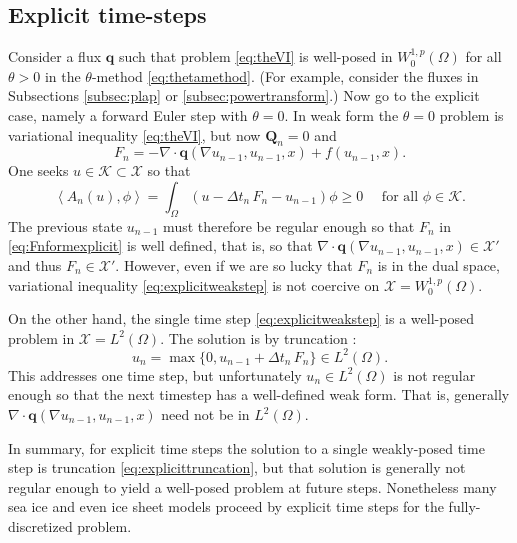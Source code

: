 \documentclass[final,onefignum]{siamart190516}
\newcommand\bq{\mathbf{q}}
\newcommand\bQ{\mathbf{Q}}
\newcommand{\Div}{\nabla\cdot}
\newcommand{\grad}{\nabla}
\newcommand{\ip}[2]{\ensuremath{\left<#1,#2\right>}}
\begin{document}
\subsection{Explicit time-steps} \label{subsec:explicit}   Consider a flux $\bq$ such that problem \eqref{eq:theVI} is well-posed in $W_0^{1,p}(\Omega)$ for all $\theta>0$ in the $\theta$-method \eqref{eq:thetamethod}.  (For example, consider the fluxes in Subsections \ref{subsec:plap} or \ref{subsec:powertransform}.)  Now go to the explicit case, namely a forward Euler step with $\theta=0$.  In weak form the $\theta=0$ problem is variational inequality \eqref{eq:theVI}, but now $\bQ_n=0$ and
\begin{equation}
F_n = - \Div \bq(\grad u_{n-1},u_{n-1},x) + f(u_{n-1},x).  \label{eq:Fnformexplicit}
\end{equation}
One seeks $u\in\mathcal{K} \subset \mathcal{X}$ so that
\begin{equation}
\ip{A_n(u)}{\phi} = \int_\Omega (u - \Delta t_n\,F_n - u_{n-1})\phi \ge 0 \quad \text{ for all } \phi \in \mathcal{K}.  \label{eq:explicitweakstep}
\end{equation}
The previous state $u_{n-1}$ must therefore be regular enough so that $F_n$ in \eqref{eq:Fnformexplicit} is well defined, that is, so that $\Div \bq(\grad u_{n-1},u_{n-1},x) \in \mathcal{X}'$ and thus $F_n\in\mathcal{X}'$.  However, even if we are so lucky that $F_n$ is in the dual space, variational inequality \eqref{eq:explicitweakstep} is not coercive on $\mathcal{X}=W_0^{1,p}(\Omega)$.

On the other hand, the single time step \eqref{eq:explicitweakstep} is a well-posed problem in $\mathcal{X}=L^2(\Omega)$.  The solution is by truncation \cite[page 27]{KinderlehrerStampacchia1980}:
\begin{equation}
u_n = \max\{0,u_{n-1} + \Delta t_n\,F_n\} \in L^2(\Omega). \label{eq:explicittruncation}
\end{equation}
This addresses one time step, but unfortunately $u_n \in L^2(\Omega)$ is not regular enough so that the next timestep has a well-defined weak form.  That is, generally $\Div \bq(\grad u_{n-1},u_{n-1},x)$ need not be in $L^2(\Omega)$.

In summary, for explicit time steps the solution to a single weakly-posed time step is truncation \eqref{eq:explicittruncation}, but that solution is generally not regular enough to yield a well-posed problem at future steps.  Nonetheless many sea ice \cite{Thorndikeetal1975} and even ice sheet \cite{Bueleretal2005} models proceed by explicit time steps for the fully-discretized problem.
\end{document}
